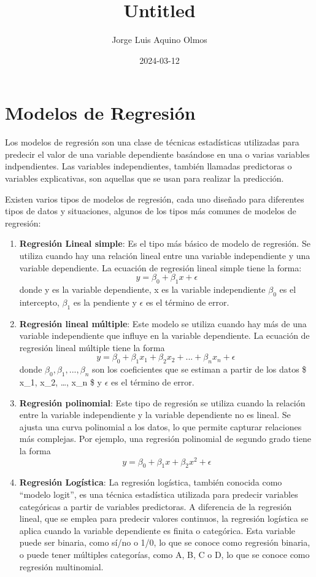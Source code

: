\documentclass[
]{article}
\title{Untitled}
\author{Jorge Luis Aquino Olmos}
\date{2024-03-12}
\begin{document}
\maketitle

\hypertarget{modelos-de-regresiuxf3n}{%
\section{Modelos de Regresión}\label{modelos-de-regresiuxf3n}}

Los modelos de regresión son una clase de técnicas estadísticas
utilizadas para predecir el valor de una variable dependiente basándose
en una o varias variables indpendientes. Las variables independientes,
también llamadas predictoras o variables explicativas, son aquellas que
se usan para realizar la predicción.

Existen varios tipos de modelos de regresión, cada uno diseñado para
diferentes tipos de datos y situaciones, algunos de los tipos más
comunes de modelos de regresión:

\begin{enumerate}
\def\labelenumi{\arabic{enumi}.}
\item
  \textbf{Regresión Lineal simple}: Es el tipo más básico de modelo de
  regresión. Se utiliza cuando hay una relación lineal entre una
  variable independiente y una variable dependiente. La ecuación de
  regresión lineal simple tiene la forma:
  \[ y = \beta_0 + \beta_1x + \epsilon\] donde y es la variable
  dependiente, x es la variable independiente \(\beta_0\) es el
  intercepto, \(\beta_1\) es la pendiente y \(\epsilon\) es el término
  de error.
\item
  \textbf{Regresión lineal múltiple}: Este modelo se utiliza cuando hay
  más de una variable independiente que influye en la variable
  dependiente. La ecuación de regresión lineal múltiple tiene la forma
  \[y = \beta_0 + \beta_1 x_1 + \beta_2 x_2 + ... + \beta_nx_n + \epsilon\ \]donde
  \(\beta_0, \beta_1, ... ,\beta_n\) son los coeficientes que se estiman
  a partir de los datos \$ x\_1, x\_2, \ldots, x\_n \$ y \(\epsilon\) es
  el término de error.
\item
  \textbf{Regresión polinomial}: Este tipo de regresión se utiliza
  cuando la relación entre la variable independiente y la variable
  dependiente no es lineal. Se ajusta una curva polinomial a los datos,
  lo que permite capturar relaciones más complejas. Por ejemplo, una
  regresión polinomial de segundo grado tiene la forma
  \[ y=\beta_0+\beta_1x+\beta_2x^2+\epsilon \]
\item
  \textbf{Regresión Logística}: La regresión logística, también conocida
  como ``modelo logit'', es una técnica estadística utilizada para
  predecir variables categóricas a partir de variables predictoras. A
  diferencia de la regresión lineal, que se emplea para predecir valores
  continuos, la regresión logística se aplica cuando la variable
  dependiente es finita o categórica. Esta variable puede ser binaria,
  como sí/no o 1/0, lo que se conoce como regresión binaria, o puede
  tener múltiples categorías, como A, B, C o D, lo que se conoce como
  regresión multinomial.
\end{enumerate}
\end{document}
